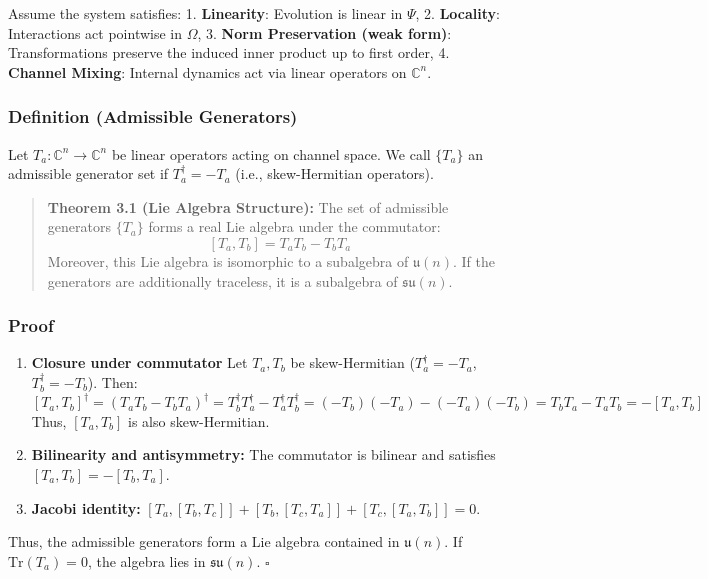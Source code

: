 \documentclass[
]{article}
\begin{document}
Assume the system satisfies: 1. \textbf{Linearity}: Evolution is linear
in \(\Psi\), 2. \textbf{Locality}: Interactions act pointwise in
\(\Omega\), 3. \textbf{Norm Preservation (weak form)}: Transformations
preserve the induced inner product up to first order, 4. \textbf{Channel
Mixing}: Internal dynamics act via linear operators on \(\mathbb{C}^n\).

\subsubsection{Definition (Admissible
Generators)}\label{definition-admissible-generators}

Let \(T_a : \mathbb{C}^n \to \mathbb{C}^n\) be linear operators acting
on channel space. We call \(\{T_a\}\) an admissible generator set if
\(T_a^\dagger = -T_a\) (i.e., skew-Hermitian operators).

\begin{quote}
\textbf{Theorem 3.1 (Lie Algebra Structure):} The set of admissible
generators \(\{T_a\}\) forms a real Lie algebra under the commutator:
\[ [T_a, T_b] = T_a T_b - T_b T_a \] Moreover, this Lie algebra is
isomorphic to a subalgebra of \(\mathfrak{u}(n)\). If the generators are
additionally traceless, it is a subalgebra of \(\mathfrak{su}(n)\).
\end{quote}

\subsubsection{Proof}\label{proof}

\begin{enumerate}
\def\labelenumi{\arabic{enumi}.}
\item
  \textbf{Closure under commutator} Let \(T_a, T_b\) be skew-Hermitian
  (\(T_a^\dagger = -T_a\), \(T_b^\dagger = -T_b\)). Then:
  \[ [T_a, T_b]^\dagger = (T_a T_b - T_b T_a)^\dagger = T_b^\dagger T_a^\dagger - T_a^\dagger T_b^\dagger = (-T_b)(-T_a) - (-T_a)(-T_b) = T_b T_a - T_a T_b = -[T_a, T_b] \]
  Thus, \([T_a, T_b]\) is also skew-Hermitian.
\item
  \textbf{Bilinearity and antisymmetry:} The commutator is bilinear and
  satisfies \([T_a, T_b] = -[T_b, T_a]\).
\item
  \textbf{Jacobi identity:}
  \([T_a,[T_b,T_c]] + [T_b,[T_c,T_a]] + [T_c,[T_a,T_b]] = 0\).
\end{enumerate}

Thus, the admissible generators form a Lie algebra contained in
\(\mathfrak{u}(n)\). If \(\mathrm{Tr}(T_a)=0\), the algebra lies in
\(\mathfrak{su}(n)\). \(\square\)
\end{document}
